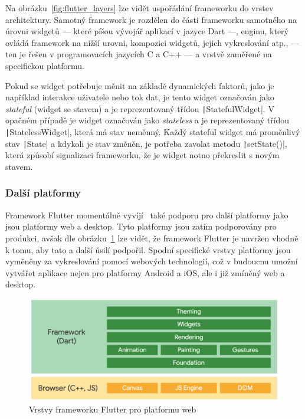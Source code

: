 Na obrázku~\ref{fig:flutter_layers} lze vidět uspořádání frameworku do vrstev
architektury.
Samotný framework je rozdělen do části frameworku samotného na úrovni widgetů
--- které píšou vývojář aplikací v jazyce Dart ---,
enginu, který ovládá framework na nižší urovni,
kompozici widgetů, jejich vykreslování atp.,
--- ten je řešen v programovacích jazycích C a C++ ---
a vrstvě zaměřené na specifickou platformu.
\cite{flutter_technical_overview}

Pokud se widget potřebuje měnit na základě dynamických faktorů,
jako je například interakce uživatele nebo tok dat,
je tento widget označován jako \emph{stateful} (widget se stavem) a je
reprezentovaný třídou \texttt|StatefulWidget|.
V opačném případě je widget označován jako \emph{stateless} a je 
reprezentovaný třídou \texttt|StatelessWidget|,
která má stav neměnný.
Každý stateful widget má proměnlivý stav \texttt|State|
a kdykoli je stav změněn,
je potřeba zavolat metodu \texttt|setState()|,
která způsobí signalizaci frameworku,
že je widget notno překreslit s novým stavem.
\cite{flutter_technical_overview}

\subsubsection*{Další platformy}

Framework Flutter momentálně vyvíjí~\cite{flutter_web} také podporu pro
další platformy jako jsou platformy web a desktop.
Tyto platformy jsou zatím podporovány pro produkci,
avšak dle obrázku~\ref{fig:flutter_layers_web} lze vidět,
že framework Flutter je navržen vhodně k tomu,
aby tato a další úsilí podpořil.
Spodní specifické vrstvy platformy jsou vyměněny za vykreslování pomocí
webových technologií,
což v budoucnu umožní vytvářet aplikace nejen pro platformy Android a iOS,
ale i již zmíněný web a desktop. 

\begin{figure}[ht!]
    \centering
    \includegraphics[width=\linewidth]{assets/technology-research/framework/flutter_overview_web.png}
    \caption{Vrstvy frameworku Flutter pro platformu web
    ~\cite{flutter_web}}
    \label{fig:flutter_layers_web}
\end{figure}

